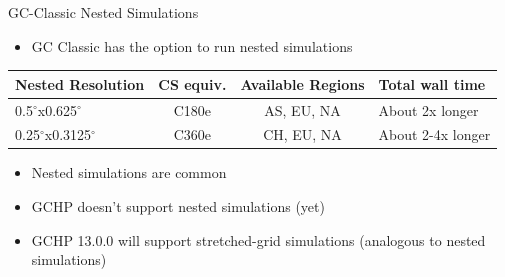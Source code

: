 \documentclass[10pt]{beamer}
\begin{document}
\begin{frame}[fragile]{GC-Classic Nested Simulations}
    \begin{itemize}
        \item GC Classic has the option to run nested simulations
    \end{itemize}
    
    \footnotesize
    \begin{table}[]
    \begin{tabular}{lccl}
        \hline
        \textbf{Nested Resolution} & \textbf{CS equiv.} &  \textbf{Available Regions} & \textbf{Total wall time} \\ 
        \hline
        0.5$^{\circ}$x0.625$^{\circ}$ & C180e & AS, EU, NA & About 2x longer \\ 
        0.25$^{\circ}$x0.3125$^{\circ}$ & C360e & CH, EU, NA & About 2-4x longer \\ 
        \hline
    \end{tabular}
    \end{table}
    \vfill
    \normalsize
    \begin{itemize}
        \item Nested simulations are common
        \item GCHP doesn't support nested simulations (yet)
        \item GCHP 13.0.0 will support stretched-grid simulations (analogous to nested simulations)
    \end{itemize}
\end{frame}
\end{document}
